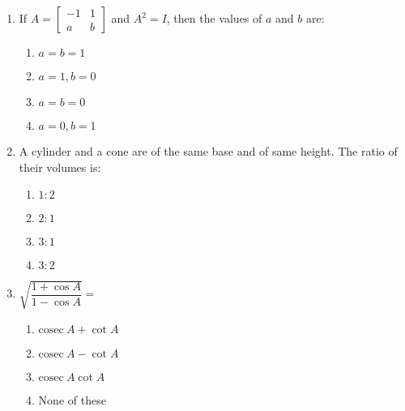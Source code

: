 \begin{enumerate}[label=(\roman*)]
    \item If $A = \begin{bmatrix*} -1 & 1 \\ a & b \end{bmatrix*}$ and $A^2 = I$,
        then the values of $a$ and $b$ are:

        \begin{multicols}{2}
        \begin{enumerate}[label=(\alph*)]
            \item $a=b=1$ 
            \item $a=1, b=0$ 
            \item $a=b=0$ 
            \item $a=0, b=1$ 
        \end{enumerate}
        \end{multicols}

    \item A cylinder and a cone are of the same base and of same height. The 
        ratio of their volumes is:

        \begin{multicols}{2}
        \begin{enumerate}[label=(\alph*)]
            \item $1:2$
            \item $2:1$
            \item $3:1$
            \item $3:2$
        \end{enumerate}
        \end{multicols}

    \item $\sqrt{\dfrac{1 + \cos A}{1 - \cos A}} = $

        \begin{multicols}{2}
        \begin{enumerate}[label=(\alph*)]
            \item $\mathrm{cosec} \ A + \cot A$ 
            \item $\mathrm{cosec} \ A - \cot A$ 
            \item $\mathrm{cosec} \ A \cot A$ 
            \item None of these
        \end{enumerate}
        \end{multicols}


\end{enumerate}
